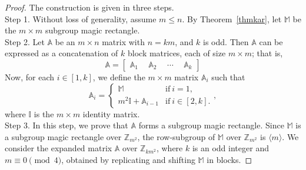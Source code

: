 \documentclass[preprint,11pt]{elsarticle}
\begin{document}
\begin{proof}
    The construction is given in three steps. 
    \\
    \noindent Step 1. Without loss of generality, assume $m \leq n$. By Theorem~\ref{thmkar},  let $\mathbb{M}$ be the $m \times m$ subgroup magic rectangle.\\
    \noindent Step 2. Let $\mathbb{A}$ be an $m \times n$ matrix with $n = km$, and $k$ is odd. 
Then $\mathbb{A}$ can be expressed as a concatenation of $k$ block matrices, each of size $m \times m$; that is,
\[
\mathbb{A} = \begin{bmatrix} 
\mathbb{A}_1 ~~& \mathbb{A}_2 ~~& \cdots & ~~\mathbb{A}_k
\end{bmatrix}
\]
Now, for each $i\in [1,k]$, we define the $m\times m$ matrix $\mathbb{A}_i$ such that \[\mathbb{A}_i=\begin{cases}
    \mathbb{M} & \text{if} ~i=1, \\
    m^2\mathbb{I}+ \mathbb{A}_{i-1} & \text{if}~ i \in [2,k].\end{cases},\]
where $\mathbb{I}$ is the $m\times m$ identity matrix.\\
\noindent Step 3. In this step, we prove that $\mathbb{A}$ forms a subgroup magic rectangle. Since $\mathbb{M}$ is a subgroup magic rectangle over $\mathbb{Z}_{m^2}$, the row-subgroup of $\mathbb{M}$ over $\mathbb{Z}_{m^2}$ is $\langle m\rangle$. We consider the expanded matrix $\mathbb{A}$ over $\mathbb{Z}_{k m^2}$, where $k$ is an odd integer and $m \equiv 0 \pmod{4}$, obtained by replicating and shifting $\mathbb{M}$ in blocks.


\end{proof}
\end{document}
